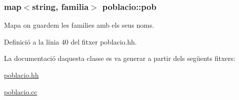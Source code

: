 \subsubsection[{\texorpdfstring{pob}{pob}}]{\setlength{\rightskip}{0pt plus 5cm}map$<$string, {\bf familia}$>$ poblacio\+::pob\hspace{0.3cm}{\ttfamily [private]}}\hypertarget{classpoblacio_a7ecb70033b151a937143b07d489c4c17}{}\label{classpoblacio_a7ecb70033b151a937143b07d489c4c17}


Mapa on guardem les families amb els seus noms. 



Definició a la línia 40 del fitxer poblacio.\+hh.



La documentació d\textquotesingle{}aquesta classe es va generar a partir dels següents fitxers\+:\begin{DoxyCompactItemize}
\item 
\hyperlink{poblacio_8hh}{poblacio.\+hh}\item 
\hyperlink{poblacio_8cc}{poblacio.\+cc}\end{DoxyCompactItemize}
